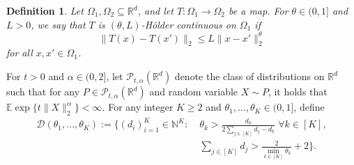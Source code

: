 \documentclass[11pt]{article}
\newtheorem{defn}{Definition}
\begin{document}

\begin{defn}\label{def:HolderConti}
Let $ \Omega_1, \Omega_2 \subseteq \mathbb R^d$, and let $T: \Omega_1\to \Omega_2$ be a map. For $\theta\in(0,1]$ and $L>0$, we say that $T$ is $(\theta,L)$-H\"older continuous on $\Omega_1$ if 
\[
\|T(x)-T(x')\|_2 \le L\|x-x'\|_2^\theta
\]
for all $x,x'\in \Omega_1$.
\end{defn} 

For $t>0$ and $\alpha \in (0, 2]$, let $\mathcal{P}_{t, \alpha}(\mathbb{R}^d)$ denote the class of
distributions on $\mathbb{R}^d$ such that for any $P \in \mathcal{P}_{t, \alpha}(\mathbb{R}^d)$ and random variable $X \sim P$, it holds that $\mathbb{E}\exp\{t\|X\|_2^\alpha\}<\infty$. For any integer $K \geq 2$ and $\theta_1, \ldots, \theta_K \in (0, 1]$, define
\begin{align*}
\mathcal{D}(\theta_1,\ldots,\theta_K) := \biggl\{(d_i)_{i = 1}^K\in\mathbb{N}^K:\; & \theta_k > \frac{d_k}{2\sum_{j\in[K]}d_j - d_k}\;\forall k\in[K],
\\
& \sum_{j\in[K]} d_j > \frac{2}{\min_{k\in[K]}\theta_k}+2\biggr\}.
\end{align*}
\end{document}
